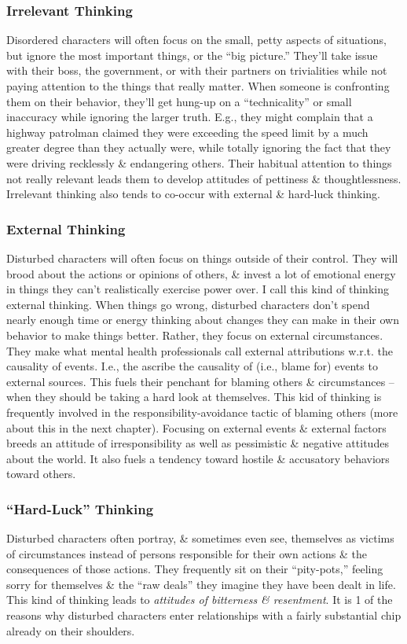 \documentclass{article}
\numberwithin{equation}{section}
\begin{document}
\subsubsection{Irrelevant Thinking}
Disordered characters will often focus on the small, petty aspects of situations, but ignore the most important things, or the ``big picture.'' They'll take issue with their boss, the government, or with their partners on trivialities while not paying attention to the things that really matter. When someone is confronting them on their behavior, they'll get hung-up on a ``technicality'' or small inaccuracy while ignoring the larger truth. E.g., they might complain that a highway patrolman claimed they were exceeding the speed limit by a much greater degree than they actually were, while totally ignoring the fact that they were driving recklessly \& endangering others. Their habitual attention to things not really relevant leads them to develop attitudes of pettiness \& thoughtlessness. Irrelevant thinking also tends to co-occur with external \& hard-luck thinking.

\subsubsection{External Thinking}
Disturbed characters will often focus on things outside of their control. They will brood about the actions or opinions of others, \& invest a lot of emotional energy in things they can't realistically exercise power over. I call this kind of thinking external thinking. When things go wrong, disturbed characters don't spend nearly enough time or energy thinking about changes they can make in their own behavior to make things better. Rather, they focus on external circumstances. They make what mental health professionals call external attributions w.r.t. the causality of events. I.e., the ascribe the causality of (i.e., blame for) events to external sources. This fuels their penchant for blaming others \& circumstances -- when they should be taking a hard look at themselves. This kid of thinking is frequently involved in the responsibility-avoidance tactic of blaming others (more about this in the next chapter). Focusing on external events \& external factors breeds an attitude of irresponsibility as well as pessimistic \& negative attitudes about the world. It also fuels a tendency toward hostile \& accusatory behaviors toward others.

\subsubsection{``Hard-Luck'' Thinking}
Disturbed characters often portray, \& sometimes even see, themselves as victims of circumstances instead of persons responsible for their own actions \& the consequences of those actions. They frequently sit on their ``pity-pots,'' feeling sorry for themselves \& the ``raw deals'' they imagine they have been dealt in life. This kind of thinking leads to \textit{attitudes of bitterness \& resentment}. It is 1 of the reasons why disturbed characters enter relationships with a fairly substantial chip already on their shoulders.
\end{document}

